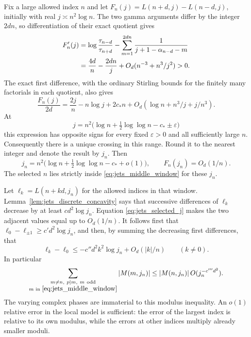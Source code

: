 \documentclass[11pt]{article}
\numberwithin{equation}{section}
\theoremstyle{definition}
\newcommand{\eps}{\varepsilon}
\begin{document}
Fix a large allowed index $n$ and let
$F_n(j)=L(n+d,j)-L(n-d,j)$, initially with real
$j\asymp n^2\log n$. The two gamma arguments differ by the
integer $2dn$, so differentiation of their exact quotient gives
\begin{align}
 F_n'(j)
 &=\log\frac{\tau_{n-d}}{\tau_{n+d}}
    -\sum_{m=1}^{2dn}\frac1{j+1-\alpha_{n-d}-m}\notag\\
 &=\frac{4d}{n}-\frac{2dn}{j}
    +O_d(n^{-3}+n^3/j^2)>0.
 \label{eq:jets_crossing_derivative}
\end{align}
The exact first difference, with the ordinary Stirling bounds for
the finitely many factorials in each quotient, also gives
\begin{equation}\label{eq:jets_crossing_expansion}
 \frac{F_n(j)}{2d}=\frac{2j}{n}-n\log j+2c_*n
       +O_d(\log n+n^3/j+j/n^3).
\end{equation}
At
\[
 j=n^2\bigl(\log n+\tfrac12\log\log n-c_*\pm\eps\bigr)
\]
this expression has opposite signs for every fixed $\eps>0$ and
all sufficiently large $n$. Consequently there is a unique
crossing in this range. Round it to the nearest integer and denote
the result by $j_n$. Then
\begin{equation}\label{eq:jets_selected_j}
 j_n=n^2\bigl(\log n+\tfrac12\log\log n-c_*+o(1)\bigr),
 \qquad F_n(j_n)=O_d(1/n).
\end{equation}
The selected $n$ lies strictly inside
\eqref{eq:jets_middle_window} for these $j_n$.

Let $\ell_k=L(n+kd,j_n)$ for the allowed indices in that window.
Lemma~\ref{lem:jets_discrete_concavity} says that successive
differences of $\ell_k$ decrease by at least $c d^2\log j_n$.
Equation \eqref{eq:jets_selected_j} makes the two adjacent values
equal up to $O_d(1/n)$. It follows first that
$\ell_0-\ell_{\pm1}\ge c'd^2\log j_n$, and then, by summing
the decreasing first differences, that
\[
 \ell_k-\ell_0\le -c''d^2 k^2\log j_n+O_d(|k|/n)
 \qquad(k\ne0).
\]
In particular
\begin{equation}\label{eq:jets_single_index}
 \sum_{\substack{m\ne n,\ p\mid m,\ m\ \mathrm{odd}\\
                  m\text{ in }\eqref{eq:jets_middle_window}}}
 |M(m,j_n)|
 \le |M(n,j_n)|\,O(j_n^{-c'''d^2}).
\end{equation}
The varying complex phases are immaterial to this modulus
inequality. An $o(1)$ relative error in the local model is
sufficient: the error of the largest index is relative to its own
modulus, while the errors at other indices multiply already
smaller moduli.
\end{document}
